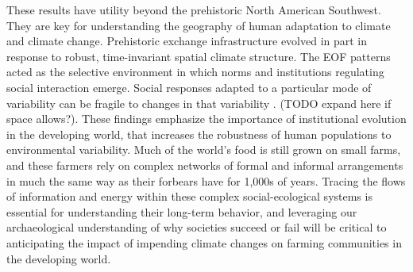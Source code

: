 \documentclass[10pt]{iopart}
\begin{document}
These results have utility beyond the prehistoric North American Southwest. They are key for understanding the geography of human adaptation to climate and climate change. Prehistoric exchange infrastructure evolved in part in response to robust, time-invariant spatial climate structure. The EOF patterns acted as the selective environment in which norms and institutions regulating social interaction emerge. Social responses adapted to a particular mode of variability can be fragile to changes in that variability \parencite{Janssen2007}. (TODO expand here if space allows?). These findings emphasize the importance of institutional evolution in the developing world, that increases the robustness of human populations to environmental variability. Much of the world's food is still grown on small farms, and these farmers rely on complex networks of formal and informal arrangements in much the same way as their forbears have for 1,000s of years. Tracing the flows of information and energy within these complex social-ecological systems is essential for understanding their long-term behavior, and leveraging our archaeological understanding of why societies succeed or fail will be critical to anticipating the impact of impending climate changes on farming communities in the developing world.









\end{document}
